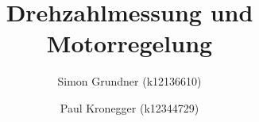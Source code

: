 \documentclass[a4paper,oneside,11pt,ngerman]{scrartcl}
\begin{document}
\title{Drehzahlmessung und Motorregelung}
\author{Simon Grundner (k12136610) \and Paul Kronegger (k12344729)}


% 
\tableofcontents








\end{document}
